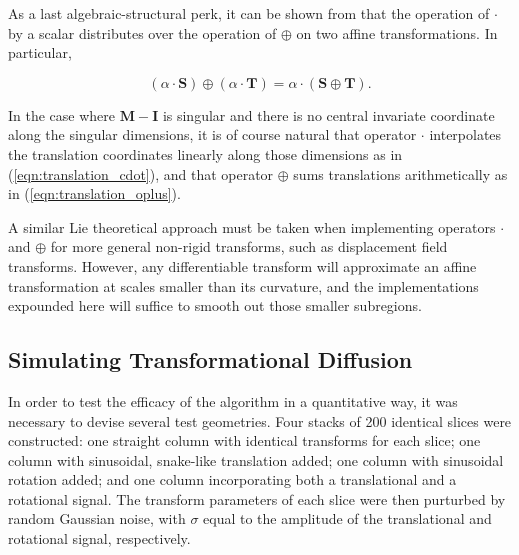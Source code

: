         As a last algebraic-structural perk, it can be shown from  that the operation of $\cdot$ by a scalar distributes over the operation of $\oplus$ on two affine transformations. In particular,
        
        \begin{equation}
          (\alpha \cdot \mathbf{S}) \oplus (\alpha \cdot \mathbf{T}) = \alpha \cdot (\mathbf{S} \oplus \mathbf{T}).
        \end{equation}
        
        In the case where $\mathbf{M} - \mathbf{I}$ is singular and there is no central invariate coordinate along the singular dimensions, it is of course natural that operator $\cdot$ interpolates the translation coordinates linearly along those dimensions as in (\ref{eqn:translation_cdot}), and that operator $\oplus$ sums translations arithmetically as in (\ref{eqn:translation_oplus}).
        
        A similar Lie theoretical approach must be taken when implementing operators $\cdot$ and $\oplus$ for more general non-rigid transforms, such as displacement field transforms. However, any differentiable transform will approximate an affine transformation at scales smaller than its curvature, and the implementations expounded here will suffice to smooth out those smaller subregions.
	
  \subsection{Simulating Transformational Diffusion} %
  \label{sub:simulating_transformational_diffusion}
  
  In order to test the efficacy of the algorithm in a quantitative way, it was necessary to devise several test geometries. Four stacks of 200 identical slices were constructed: one straight column with identical transforms for each slice; one column with sinusoidal, snake-like translation added; one column with sinusoidal rotation added; and one column incorporating both a translational and a rotational signal. The transform parameters of each slice were then purturbed by random Gaussian noise, with $\sigma$ equal to the amplitude of the translational and rotational signal, respectively.
  
